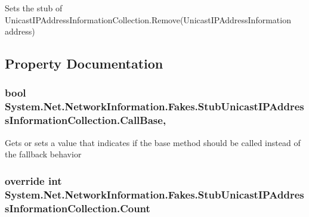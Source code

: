Sets the stub of Unicast\-I\-P\-Address\-Information\-Collection.\-Remove(\-Unicast\-I\-P\-Address\-Information address)



\subsection{Property Documentation}
\hypertarget{class_system_1_1_net_1_1_network_information_1_1_fakes_1_1_stub_unicast_i_p_address_information_collection_a505e75c67eb1c81f5ce6135d409e62d9}{
\subsubsection[{Call\-Base}]{\setlength{\rightskip}{0pt plus 5cm}bool System.\-Net.\-Network\-Information.\-Fakes.\-Stub\-Unicast\-I\-P\-Address\-Information\-Collection.\-Call\-Base\hspace{0.3cm}{\ttfamily [get]}, {\ttfamily [set]}}}\label{class_system_1_1_net_1_1_network_information_1_1_fakes_1_1_stub_unicast_i_p_address_information_collection_a505e75c67eb1c81f5ce6135d409e62d9}


Gets or sets a value that indicates if the base method should be called instead of the fallback behavior

\hypertarget{class_system_1_1_net_1_1_network_information_1_1_fakes_1_1_stub_unicast_i_p_address_information_collection_a4138a834da82a1e097490b8d7d6009d8}{
\subsubsection[{Count}]{\setlength{\rightskip}{0pt plus 5cm}override int System.\-Net.\-Network\-Information.\-Fakes.\-Stub\-Unicast\-I\-P\-Address\-Information\-Collection.\-Count\hspace{0.3cm}{\ttfamily [get]}}}\label{class_system_1_1_net_1_1_network_information_1_1_fakes_1_1_stub_unicast_i_p_address_information_collection_a4138a834da82a1e097490b8d7d6009d8}


